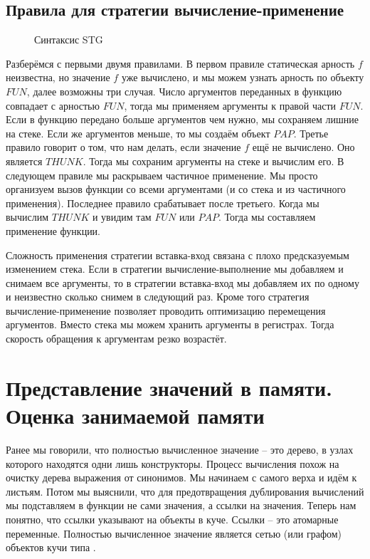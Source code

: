 \subsection{Правила для стратегии вычисление-применение}

\begin{figure}[ht]
\centering

\caption{Синтаксис STG}
\label{fig:stg-rules-eval-apply}
\end{figure}

Разберёмся с первыми двумя правилами. В первом правиле статическая
арность $f$ неизвестна, но значение $f$ уже вычислено, и мы можем узнать
арность по объекту $FUN$, далее возможны три случая. Число аргументов
переданных в функцию совпадает с арностью $FUN$, тогда мы применяем
аргументы к правой части $FUN$. Если в функцию передано больше
аргументов чем нужно, мы сохраняем лишние на стеке. Если же аргументов
меньше, то мы создаём объект $PAP$. Третье правило говорит о том, что
нам делать, если значение $f$ ещё не вычислено. Оно является $THUNK$.
Тогда мы сохраним аргументы на стеке и вычислим его. В следующем правиле
мы раскрываем частичное применение. Мы просто организуем вызов функции
со всеми аргументами (и со стека и из частичного применения). Последнее
правило срабатывает после третьего. Когда мы вычислим $THUNK$ и увидим
там $FUN$ или $PAP$. Тогда мы составляем применение функции.

Сложность применения стратегии вставка-вход связана с плохо
предсказуемым изменением стека. Если в стратегии вычисление-выполнение
мы добавляем и снимаем все аргументы, то в стратегии вставка-вход мы
добавляем их по одному и неизвестно сколько снимем в следующий раз.
Кроме того стратегия вычисление-применение позволяет проводить
оптимизацию перемещения аргументов. Вместо стека мы можем хранить
аргументы в регистрах. Тогда скорость обращения к аргументам резко
возрастёт.

\section{Представление значений в памяти. Оценка занимаемой памяти}

Ранее мы говорили, что полностью вычисленное значение -- это дерево, в
узлах которого находятся одни лишь конструкторы. Процесс вычисления
похож на очистку дерева выражения от синонимов. Мы начинаем с самого
верха и идём к листьям. Потом мы выяснили, что для предотвращения
дублирования вычислений мы подставляем в функции не сами значения, а
ссылки на значения. Теперь нам понятно, что ссылки указывают на объекты
в куче. Ссылки -- это атомарные переменные. Полностью вычисленное
значение является сетью (или графом) объектов кучи типа .

